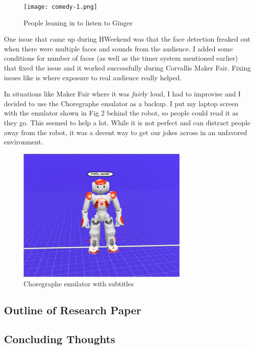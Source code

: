 \documentclass[onecolumn, draftclsnofoot,10pt, compsoc]{IEEEtran}
\begin{document}
\begin{figure}[H]
  \centering
  \texttt{[image: comedy-1.png]}
  \caption{People leaning in to listen to Ginger}
	\label{fig:comedy-1}
\end{figure}

One issue that came up during HWeekend was that the face detection freaked out when there were multiple faces and sounds from the audience. I added some conditions for number of faces (as well as the timer system mentioned earlier) that fixed the issue and it worked successfully during Corvallis Maker Fair. Fixing issues like is where exposure to real audience really helped.

In situations like Maker Fair where it was \textit{fair}ly loud, I had to improvise and I decided to use the Choregraphe emulator as a backup. I put my laptop screen with the emulator shown in Fig 2 behind the robot, so people could read it as they go. This seemed to help a lot. While it is not perfect and can distract people away from the robot, it was a decent way to get our jokes across in an unfavored environment.

\begin{figure}[H]
  \centering
  \includegraphics[width=0.75\textwidth,height=0.75\textheight,keepaspectratio]{comedy-2.png}
  \caption{Choregraphe emulator with subtitles}
	\label{fig:comedy-2}
\end{figure}

\subsection{Outline of Research Paper}
\subsection{Concluding Thoughts}
\end{document}
